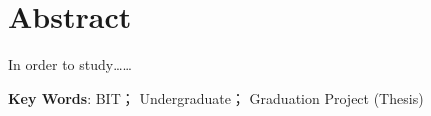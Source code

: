 %
%
%
%
%

\vspace*{-11mm}

\begin{center}
  \heiti{}\textbf{\thesisTitle}
\end{center}

\vspace*{2mm}

{\let\clearpage\relax \chapter*{ \Arial\textbf{Abstract}}}
\setcounter{page}{2}

\vspace*{1mm}

\setlength{\parskip}{0em}

In order to study……









\vspace{3ex}\noindent\textbf{Key Words}: BIT； Undergraduate； Graduation Project (Thesis)
\newpage
